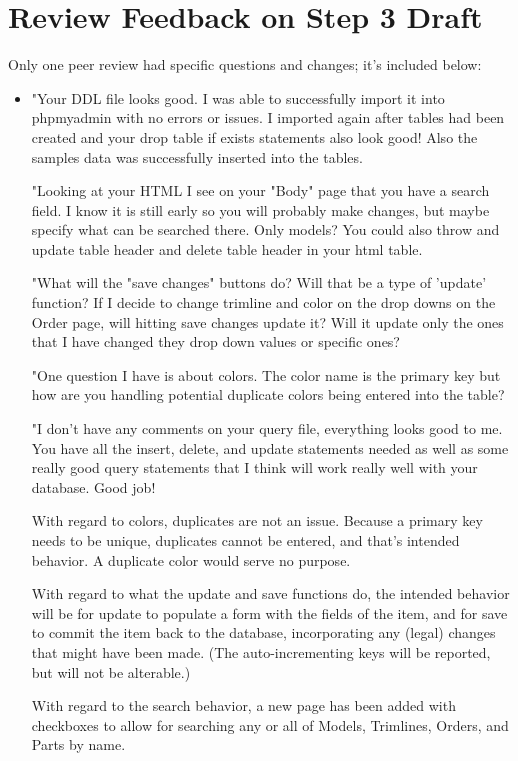 \documentclass[11pt,letterpaper,oneside]{amsart}
\begin{document}
\section*{Review Feedback on Step 3 Draft}

Only one peer review had specific questions and changes; it's included below:

\begin{itemize}

\item "Your DDL file looks good. I was able to successfully import it into phpmyadmin with no errors or issues. I imported again after tables had been created and your drop table if exists statements also look good! Also the samples data was successfully inserted into the tables.

"Looking at your HTML I see on your "Body" page that you have a search field. I know it is still early so you will probably make changes, but maybe specify what can be searched there. Only models? You could also throw and update table header and delete table header in your html table.

"What will the "save changes" buttons do? Will that be a type of 'update' function? If I decide to change trimline and color on the drop downs on the Order page, will hitting save changes update it? Will it update only the ones that I have changed they drop down values or specific ones?

"One question I have is about colors. The color name is the primary key but how are you handling potential duplicate colors being entered into the table?

"I don't have any comments on your query file, everything looks good to me. You have all the insert, delete, and update statements needed as well as some really good query statements that I think will work really well with your database. Good job!

With regard to colors, duplicates are not an issue.  Because a primary key needs to be unique, duplicates cannot be entered, and that's intended behavior.  A duplicate color would serve no purpose.

With regard to what the update and save functions do, the intended behavior will be for update to populate a form with the fields of the item, and for save to commit the item back to the database, incorporating any (legal) changes that might have been made.  (The auto-incrementing keys will be reported, but will not be alterable.)

With regard to the search behavior, a new page has been added with checkboxes to allow for searching any or all of Models, Trimlines, Orders, and Parts by name.

\end{itemize}
\end{document}
